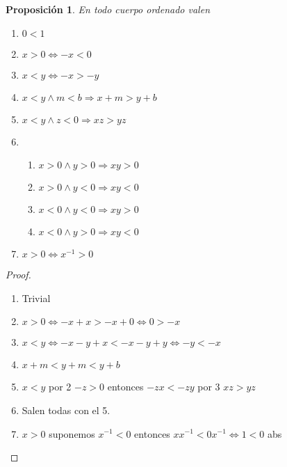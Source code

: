 \documentclass{article}
\theoremstyle{break}
\newtheorem{proposition}{Proposición}
\begin{document}
        \begin{proposition}
            En todo cuerpo ordenado valen
            \begin{enumerate}
                \item $0<1$
                \item $x>0 \iff -x<0$
                \item $x<y \iff -x>-y$
                \item $x<y \land m < b \Rightarrow x+m>y +b$
                \item $x<y \land z<0 \Rightarrow xz > yz$
                \item
                \begin{enumerate}
                    \item $x>0 \land y>0 \Rightarrow xy>0$
                    \item $x>0 \land y<0 \Rightarrow xy<0$
                    \item $x<0 \land y<0 \Rightarrow xy>0$
                    \item $x<0 \land y>0 \Rightarrow xy<0$
                \end{enumerate}
                \item $x>0 \iff x^{-1} >0$
            \end{enumerate}
        \end{proposition}
        \begin{proof}
            \begin{enumerate}
                \item Trivial
                \item $x>0 \iff -x +x > -x +0 \iff 0> -x$
                \item $x<y \iff -x - y + x < -x -y +y \iff -y < -x $
                \item $x + m < y +m < y+b$
                \item $x<y$ por 2 $-z>0$ entonces $-zx<-zy$ por 3 $xz>yz$
                \item Salen todas con el 5.
                \item $x>0$ suponemos $x^{-1} < 0$ entonces $xx^{-1} < 0x^{-1} \iff 1 < 0$ abs 
            \end{enumerate}
        \end{proof}
\end{document}
